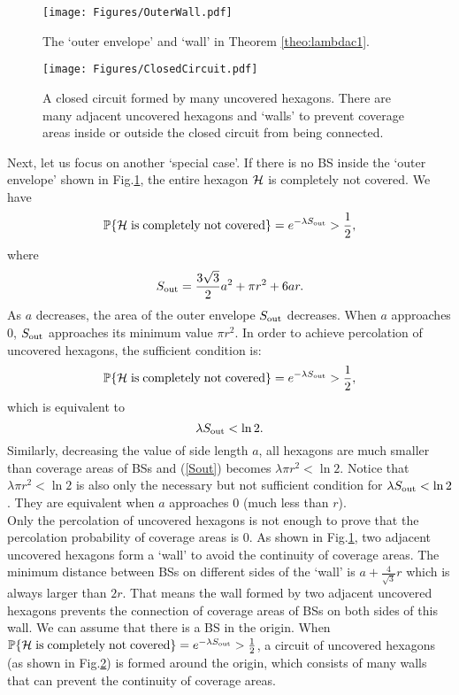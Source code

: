 \documentclass[final]{IEEEtran}
\begin{document}
\begin{figure}
    \centering
    \texttt{[image: Figures/OuterWall.pdf]}
    \caption{The `outer envelope' and `wall' in Theorem \ref{theo:lambdac1}.}%
    \label{fig:OuterWall}
\end{figure}

\begin{figure}
    \centering
    \texttt{[image: Figures/ClosedCircuit.pdf]}
    \caption{A closed circuit formed by many uncovered hexagons. There are many adjacent uncovered hexagons and `walls' to prevent coverage areas inside or outside the closed circuit from being connected.}
    \label{fig:ClosedCircuit}
\end{figure}
\indent Next, let us focus on another `special case'. If there is no BS inside the `outer envelope' shown in Fig.\ref{fig:OuterWall}, the entire hexagon ${\mathcal{H}}$ is completely not covered. We have
\begin{equation}
    \mathbb{P}\{{\mathcal{H}} {\rm \;is\; completely\; not\; covered}\}=e^{-\lambda S_{\rm out}}>\frac{1}{2},
\end{equation}
where 
\begin{equation}
    S_{\rm out}=\frac{3\sqrt{3}}{2}a^2+\pi r^2+6ar.
\end{equation}
\indent As $a$ decreases, the area of the outer envelope $S_{\rm out}$ decreases. When $a$ approaches 0, $S_{\rm out}$ approaches its minimum value $\pi r^2$. In order to achieve percolation of uncovered hexagons, the sufficient condition is:
\begin{equation}
    \mathbb{P}\{{\mathcal{H}} {\rm \;is\; completely\;not \; covered}\}=e^{-\lambda S_{\rm out}}>\frac{1}{2},
\end{equation}
which is equivalent to 
\begin{equation} \label{Sout}
    \lambda S_{\rm out}<\ln 2.
\end{equation}
\indent Similarly, decreasing the value of side length $a$, all hexagons are much smaller than coverage areas of BSs and (\ref{Sout}) becomes $\lambda \pi r^2 <\ln 2$. Notice that $\lambda \pi r^2 <\ln 2$ is also only the necessary but not sufficient condition for $\lambda S_{\rm out}< \ln 2$. They are equivalent when $a$ approaches 0 (much less than $r$).\\
\indent Only the percolation of uncovered hexagons is not enough to prove that the percolation probability of coverage areas is $0$. As shown in Fig.\ref{fig:OuterWall}, two adjacent uncovered hexagons form a `wall' to avoid the continuity of coverage areas. The minimum distance between BSs on different sides of the `wall' is $a+\frac{4}{\sqrt{3}}r$ which is always larger than $2r$. That means the wall formed by two adjacent uncovered hexagons prevents the connection of coverage areas of BSs on both sides of this wall. We can assume that there is a BS in the origin. When $\mathbb{P}\{{\mathcal{H}} {\rm \;is\; completely\; not\; covered}\}=e^{-\lambda S_{\rm out}}>\frac{1}{2}$, a circuit of uncovered hexagons (as shown in Fig.\ref{fig:ClosedCircuit}) is formed around the origin, which consists of many walls that can prevent the continuity of coverage areas.\\
\end{document}
